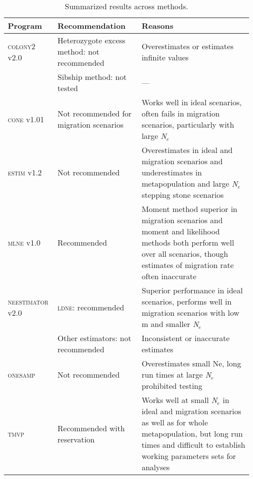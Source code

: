 \begin{table}[]
\centering \footnotesize
\caption{Summarized results across methods.}
\begin{tabular}{p{}|p{}|p{}}
\small{Program}			& \small{Recommendation}		        & \small{Reasons} \\ \hline
\textsc{colony2} v2.0 	&	Heterozygote excess method: not recommended	& Overestimates or estimates infinite values \\
						& 	Sibship method: not tested	        & --- \\ \hline
\textsc{cone} v1.01 	&	Not recommended for migration scenarios	& Works well in ideal scenarios, often fails in migration scenarios, particularly with large \emph{N}$_e$ \\ \hline
\textsc{estim} v1.2 	&	Not recommended	                    & Overestimates in ideal and migration scenarios and underestimates in metapopulation and large \emph{N}$_e$ stepping stone scenarios \\ \hline
\textsc{mlne} v1.0 		&	Recommended	                        & Moment method superior in migration scenarios and moment and likelihood methods both perform well over all scenarios, though estimates of migration rate often inaccurate \\ \hline
\textsc{neestimator} v2.0 	&	\textsc{ldne}: recommended      & Superior performance in ideal scenarios, performs well in migration scenarios with low m and smaller \emph{N}$_e$ \\
						& 	Other estimators: not recommended	& Inconsistent or inaccurate estimates \\ \hline
\textsc{onesamp} 		&	Not recommended	                    & Overestimates small Ne, long run times at large \emph{N}$_e$ prohibited testing \\ \hline 
\textsc{tmvp}			&	Recommended with reservation	    & Works well at small \emph{N}$_e$ in ideal and migration scenarios as well as for whole metapopulation, but long run times and difficult to establish working parameters sets for analyses \\
\end{tabular}
\label{tab:ne-4}
\end{table}

